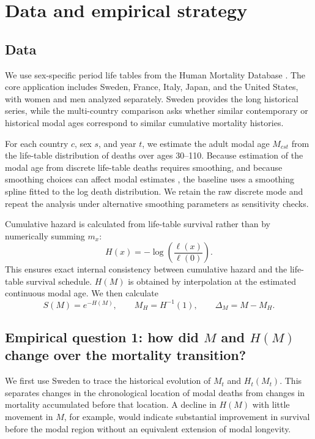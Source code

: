\documentclass[doublespace]{interact}
\begin{document}
\section{Data and empirical strategy}

\subsection{Data}

We use sex-specific period life tables from the Human Mortality Database \citep{HMD}. The core application includes Sweden, France, Italy, Japan, and the United States, with women and men analyzed separately. Sweden provides the long historical series, while the multi-country comparison asks whether similar contemporary or historical modal ages correspond to similar cumulative mortality histories.

For each country $c$, sex $s$, and year $t$, we estimate the adult modal age $M_{cst}$ from the life-table distribution of deaths over ages 30--110. Because estimation of the modal age from discrete life-table deaths requires smoothing, and because smoothing choices can affect modal estimates \citep{OuelletteBourbeau2011,Camarda2012}, the baseline uses a smoothing spline fitted to the log death distribution. We retain the raw discrete mode and repeat the analysis under alternative smoothing parameters as sensitivity checks.

Cumulative hazard is calculated from life-table survival rather than by numerically summing $m_x$:
\begin{equation}
H(x)=-\log\left(\frac{\ell(x)}{\ell(0)}\right).
\end{equation}
This ensures exact internal consistency between cumulative hazard and the life-table survival schedule. $H(M)$ is obtained by interpolation at the estimated continuous modal age. We then calculate
\begin{equation}
S(M)=e^{-H(M)}, \qquad M_H=H^{-1}(1), \qquad \Delta_M=M-M_H.
\end{equation}

\subsection{Empirical question 1: how did $M$ and $H(M)$ change over the mortality transition?}

We first use Sweden to trace the historical evolution of $M_t$ and $H_t(M_t)$. This separates changes in the chronological location of modal deaths from changes in mortality accumulated before that location. A decline in $H(M)$ with little movement in $M$, for example, would indicate substantial improvement in survival before the modal region without an equivalent extension of modal longevity.
\end{document}

